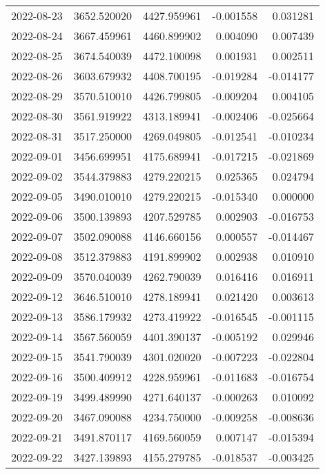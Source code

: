 \begin{tabular}{lrrrr}
2022-08-23 & 3652.520020 & 4427.959961 &       -0.001558 &     0.031281 \\
2022-08-24 & 3667.459961 & 4460.899902 &        0.004090 &     0.007439 \\
2022-08-25 & 3674.540039 & 4472.100098 &        0.001931 &     0.002511 \\
2022-08-26 & 3603.679932 & 4408.700195 &       -0.019284 &    -0.014177 \\
2022-08-29 & 3570.510010 & 4426.799805 &       -0.009204 &     0.004105 \\
2022-08-30 & 3561.919922 & 4313.189941 &       -0.002406 &    -0.025664 \\
2022-08-31 & 3517.250000 & 4269.049805 &       -0.012541 &    -0.010234 \\
2022-09-01 & 3456.699951 & 4175.689941 &       -0.017215 &    -0.021869 \\
2022-09-02 & 3544.379883 & 4279.220215 &        0.025365 &     0.024794 \\
2022-09-05 & 3490.010010 & 4279.220215 &       -0.015340 &     0.000000 \\
2022-09-06 & 3500.139893 & 4207.529785 &        0.002903 &    -0.016753 \\
2022-09-07 & 3502.090088 & 4146.660156 &        0.000557 &    -0.014467 \\
2022-09-08 & 3512.379883 & 4191.899902 &        0.002938 &     0.010910 \\
2022-09-09 & 3570.040039 & 4262.790039 &        0.016416 &     0.016911 \\
2022-09-12 & 3646.510010 & 4278.189941 &        0.021420 &     0.003613 \\
2022-09-13 & 3586.179932 & 4273.419922 &       -0.016545 &    -0.001115 \\
2022-09-14 & 3567.560059 & 4401.390137 &       -0.005192 &     0.029946 \\
2022-09-15 & 3541.790039 & 4301.020020 &       -0.007223 &    -0.022804 \\
2022-09-16 & 3500.409912 & 4228.959961 &       -0.011683 &    -0.016754 \\
2022-09-19 & 3499.489990 & 4271.640137 &       -0.000263 &     0.010092 \\
2022-09-20 & 3467.090088 & 4234.750000 &       -0.009258 &    -0.008636 \\
2022-09-21 & 3491.870117 & 4169.560059 &        0.007147 &    -0.015394 \\
2022-09-22 & 3427.139893 & 4155.279785 &       -0.018537 &    -0.003425 \\

\end{tabular}
